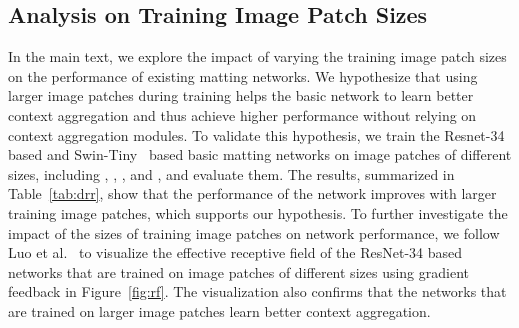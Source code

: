 \documentclass[10pt,twocolumn,letterpaper]{article}
\begin{document}
\subsection{Analysis on Training Image Patch Sizes}
In the main text, we explore the impact of varying the training image patch sizes on the performance of existing matting networks.
We hypothesize that using larger image patches during training helps the basic network to learn better context aggregation and thus achieve higher performance without relying on context aggregation modules. 
To validate this hypothesis, we train the Resnet-34~\cite{he2016deep} based and Swin-Tiny~\cite{liu2021Swin} based basic matting networks on image patches of different sizes, including , , , and , and evaluate them. 
The results, summarized in Table~\ref{tab:drr}, show that the performance of the network improves with larger training image patches, which supports our hypothesis.
To further investigate the impact of the sizes of training image patches on network performance, we follow Luo et al.~\cite{luo2016understanding} to visualize the effective receptive field of the ResNet-34 based networks that are trained on image patches of different sizes using gradient feedback in Figure~\ref{fig:rf}. 
The visualization also confirms that the networks that are trained on larger image patches learn better context aggregation.

\begin{table}[!t]
  \centering
  \caption{Diagnostic experiment on the size of training image patches. }
  \label{tab:drr}\end{table}
\end{document}
